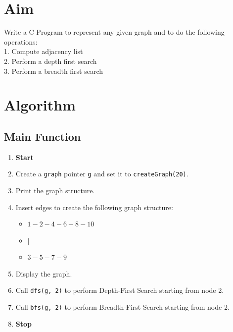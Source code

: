 
\section{Aim}
Write a C Program to represent any given graph and to do the following operations:
\\1. Compute adjacency list
\\2. Perform a depth first search
\\3. Perform a breadth first search

\section{Algorithm}
 {\selectfont
  \subsection{Main Function}
  \begin{enumerate}[label=\arabic*:,left=0pt]
    \item \textbf{Start}
    \item Create a \texttt{graph} pointer \texttt{g} and set it to \texttt{createGraph(20)}.
    \item Print the graph structure.
    \item Insert edges to create the following graph structure:
          \begin{itemize}
            \item \(1 - 2 - 4 - 6 - 8 - 10\)
            \item \(|\)
            \item \(3 - 5 - 7 - 9\)
          \end{itemize}
    \item Display the graph.
    \item Call \texttt{dfs(g, 2)} to perform Depth-First Search starting from node 2.
    \item Call \texttt{bfs(g, 2)} to perform Breadth-First Search starting from node 2.
    \item \textbf{Stop}
  \end{enumerate}

}
